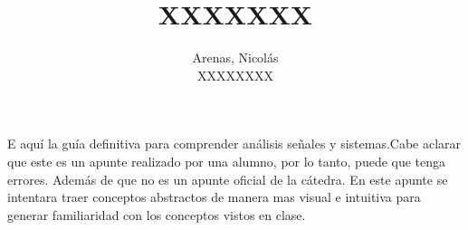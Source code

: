 

\catedra{}
\title{XXXXXXX}

\author{
        Arenas, Nicolás
        \par
        XXXXXXXX

}
\date{\the\year}






\maketitle
\tableofcontents
\newpage
{}
E aquí la guía definitiva para comprender análisis señales y sistemas.Cabe aclarar que este es un apunte realizado por una alumno, por lo tanto, puede que tenga errores. Además de que no es un apunte oficial de la cátedra. 
En este apunte se intentara traer conceptos abstractos de manera mas visual e intuitiva para generar familiaridad con los conceptos vistos en clase.

%
%



